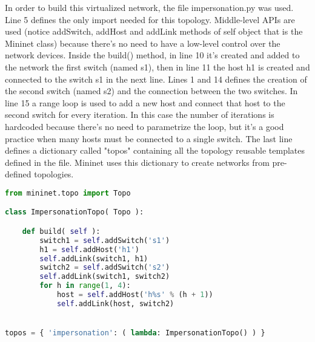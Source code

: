 \documentclass[a4paper,10pt]{memoir}
\begin{document}
In order to build this virtualized network, the file impersonation.py was used. Line 5 defines the only import needed for this topology. Middle-level APIs are used (notice addSwitch, addHost and addLink methods of self object that is the Mininet class) because there's no need to have a low-level control over the network devices. Inside the build() method, in line 10 it's created and added to the network the first switch (named s1), then in line 11 the host h1 is created and connected to the switch s1 in the next line. Lines 1 and 14 defines the creation of the second switch (named s2) and the connection between the two switches. In line 15 a range loop is used to add a new host and connect that host to the second switch for every iteration. In this case the number of iterations is hardcoded because there's no need to parametrize the loop, but it's a good practice when many hosts must be connected to a single switch. The last line defines a dictionary called "topos" containing all the topology reusable templates defined in the file. Mininet uses this dictionary to create networks from pre-defined topologies.
\begin{lstlisting}[language=python,firstnumber=5]
from mininet.topo import Topo

class ImpersonationTopo( Topo ):

    def build( self ):
        switch1 = self.addSwitch('s1')
        h1 = self.addHost('h1')
        self.addLink(switch1, h1)
        switch2 = self.addSwitch('s2')
        self.addLink(switch1, switch2)
        for h in range(1, 4):
            host = self.addHost('h%s' % (h + 1))
            self.addLink(host, switch2)


topos = { 'impersonation': ( lambda: ImpersonationTopo() ) }
\end{lstlisting}
\end{document}
